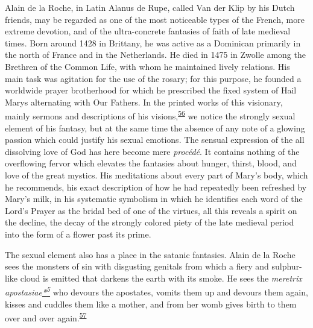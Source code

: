 Alain de la Roche, in Latin Alanus de Rupe, called Van der Klip by his
Dutch friends, may be regarded as one of the most noticeable types of
the French, more extreme devotion, and of the ultra-concrete fantasies
of faith of late medieval times. Born around 1428 in Brittany, he was
active as a Dominican primarily in the north of France and in the
Netherlands. He died in 1475 in Zwolle among the Brethren of the Common
Life, with whom he maintained lively relations. His main task was
agitation for the use of the rosary; for this purpose, he founded a
worldwide prayer brotherhood for which he prescribed the fixed system of
Hail Marys alternating with Our Fathers. In the printed works of this
visionary, mainly sermons and descriptions of his
visions,\textsuperscript{\protect\hypertarget{15_Chapter_Eight__RELIGIOUS_EXCITAT.xhtmlux5cux23id_796}{\protect\hyperlink{23_NOTES.xhtmlux5cux23id_797}{56}}}
we notice the strongly sexual element of his fantasy, but at the same
time the absence of any note of a glowing passion which could justify
his sexual emotions. The sensual expression of the all dissolving love
of God has here become mere \emph{procédé}. It contains nothing of the
overflowing fervor which elevates the fantasies about hunger, thirst,
blood, and love of the great mystics. His meditations about every part
of Mary's body, which he recommends, his exact description of how he had
repeatedly been refreshed by Mary's milk, in his systematic symbolism in
which he identifies each word of the Lord's Prayer as the bridal bed of
one of the virtues, all this reveals a spirit on the decline, the decay
of the strongly colored piety of the late medieval period into the form
of a flower past its prime.

The sexual element also has a place in the satanic fantasies. Alain de
la Roche sees the monsters of sin with disgusting genitals from which a
fiery and sulphur-like cloud is emitted that darkens the earth with its
smoke. He sees the \emph{meretrix
apostasiae\protect\hypertarget{15_Chapter_Eight__RELIGIOUS_EXCITAT.xhtmlux5cux23id_2571}{\protect\hyperlink{23_NOTES.xhtmlux5cux23id_2572}{*\textsuperscript{5}}}}
who devours the apostates, vomits them up and devours them again, kisses
and
\protect\hypertarget{15_Chapter_Eight__RELIGIOUS_EXCITAT.xhtmlux5cux23page_233}{}{}cuddles
them like a mother, and from her womb gives birth to them over and over
again.\textsuperscript{\protect\hypertarget{15_Chapter_Eight__RELIGIOUS_EXCITAT.xhtmlux5cux23id_794}{\protect\hyperlink{23_NOTES.xhtmlux5cux23id_795}{57}}}

